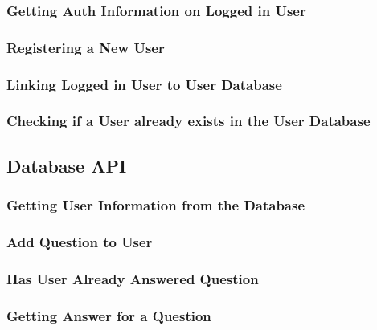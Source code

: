\subsubsection{Getting Auth Information on Logged in User}


\subsubsection{Registering a New User}


\subsubsection{Linking Logged in User to User Database}


\subsubsection{Checking if a User already exists in the User Database}


\subsection{Database API}

\subsubsection{Getting User Information from the Database}


\subsubsection{Add Question to User}


\newpage
\subsubsection{Has User Already Answered Question}


\subsubsection{Getting Answer for a Question}


